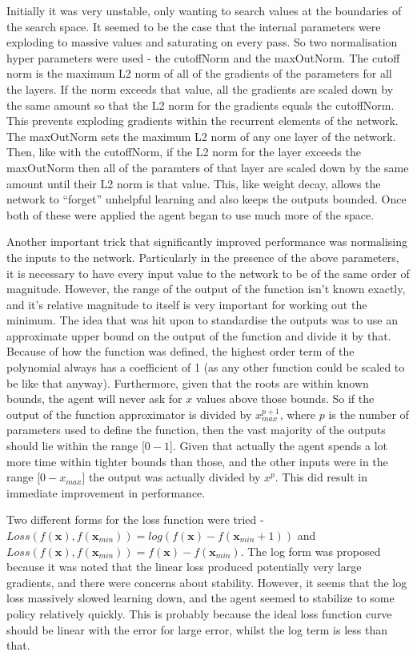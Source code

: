 Initially it was very unstable, only wanting to search values at the boundaries of the search space. It seemed to be the case that the internal parameters were exploding to massive values and saturating on every pass. So two normalisation hyper parameters were used - the cutoffNorm and the maxOutNorm. The cutoff norm is the maximum L2 norm of all of the gradients of the parameters for all the layers. If the norm exceeds that value, all the gradients are scaled down by the same amount so that the L2 norm for the gradients equals the cutoffNorm. This prevents exploding gradients within the recurrent elements of the network. The maxOutNorm sets the maximum L2 norm of any one layer of the network. Then, like with the cutoffNorm, if the L2 norm for the layer exceeds the maxOutNorm then all of the paramters of that layer are scaled down by the same amount until their L2 norm is that value. This, like weight decay, allows the network to ``forget'' unhelpful learning and also keeps the outputs bounded. Once both of these were applied the agent began to use much more of the space.

Another important trick that significantly improved performance was normalising the inputs to the network. Particularly in the presence of the above parameters, it is necessary to have every input value to the network to be of the same order of magnitude. However, the range of the output of the function isn't known exactly, and it's relative magnitude to itself is very important for working out the minimum. The idea that was hit upon to standardise the outputs was to use an approximate upper bound on the output of the function and divide it by that. Because of how the function was defined, the highest order term of the polynomial always has a coefficient of 1 (as any other function could be scaled to be like that anyway). Furthermore, given that the roots are within known bounds, the agent will never ask for $x$ values above those bounds. So if the output of the function approximator is divided by $x_{max}^{p+1}$, where $p$ is the number of parameters used to define the function, then the vast majority of the outputs should lie within the range [$0 - 1$]. Given that actually the agent spends a lot more time within tighter bounds than those, and the other inputs were in the range [$0- x_{max} $] the output was actually divided by $x^p$. This did result in immediate improvement in performance.

Two different forms for the loss function were tried - $Loss(f(\boldsymbol{x}), f(\boldsymbol{x}_{min})) = log(f(\boldsymbol{x}) - f(\boldsymbol{x}_{min} +1))$ and $Loss(f(\boldsymbol{x}), f(\boldsymbol{x}_{min})) = f(\boldsymbol{x}) - f(\boldsymbol{x}_{min})$. The log form was proposed because it was noted that the linear loss produced potentially very large gradients, and there were concerns about stability. However, it seems that the log loss massively slowed learning down, and the agent seemed to stabilize to some policy relatively quickly. This is probably because the ideal loss function curve should be linear with the error for large error, whilst the log term is less than that.

